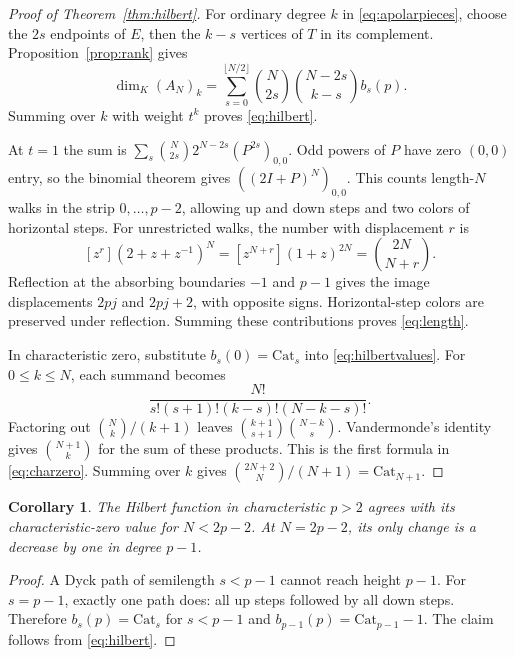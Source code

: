 \documentclass[11pt]{article}
\newtheorem{corollary}[theorem]{Corollary}
\theoremstyle{definition}
\theoremstyle{remark}
\numberwithin{equation}{section}
\newcommand{\kk}{K}
\newcommand{\Cat}{\mathrm{Cat}}
\begin{document}
\begin{proof}[Proof of Theorem~\ref{thm:hilbert}]
For ordinary degree $k$ in \eqref{eq:apolarpieces}, choose the $2s$
endpoints of $E$, then the $k-s$ vertices of $T$ in its complement.
Proposition~\ref{prop:rank} gives
\begin{equation}\label{eq:hilbertvalues}
 \dim_\kk(A_N)_k=
 \sum_{s=0}^{\lfloor N/2\rfloor}
 \binom{N}{2s}\binom{N-2s}{k-s}b_s(p).
\end{equation}
Summing over $k$ with weight $t^k$ proves \eqref{eq:hilbert}.

At $t=1$ the sum is
$\sum_s\binom{N}{2s}2^{N-2s}(P^{2s})_{0,0}$.
Odd powers of $P$ have zero $(0,0)$ entry, so the binomial theorem gives
$((2I+P)^N)_{0,0}$. This counts length-$N$ walks in the strip
$0,\ldots,p-2$, allowing up and down steps and two colors of horizontal
steps. For unrestricted walks, the number with displacement $r$ is
\[
 [z^r](2+z+z^{-1})^N
 =[z^{N+r}](1+z)^{2N}=\binom{2N}{N+r}.
\]
Reflection at the absorbing boundaries $-1$ and $p-1$ gives the image
displacements $2pj$ and $2pj+2$, with opposite signs. Horizontal-step
colors are preserved under reflection. Summing these contributions
proves \eqref{eq:length}.

In characteristic zero, substitute $b_s(0)=\Cat_s$ into
\eqref{eq:hilbertvalues}. For $0\leq k\leq N$, each summand becomes
\[
 \frac{N!}{s!(s+1)!(k-s)!(N-k-s)!}.
\]
Factoring out $\binom{N}{k}/(k+1)$ leaves
$\binom{k+1}{s+1}\binom{N-k}{s}$. Vandermonde's identity gives
$\binom{N+1}{k}$ for the sum of these products. This is the first
formula in \eqref{eq:charzero}. Summing over $k$ gives
$\binom{2N+2}{N}/(N+1)=\Cat_{N+1}$.
\end{proof}

\begin{corollary}\label{cor:first}
The Hilbert function in characteristic $p>2$ agrees with its
characteristic-zero value for $N<2p-2$. At $N=2p-2$, its only change is
a decrease by one in degree $p-1$.
\end{corollary}

\begin{proof}
A Dyck path of semilength $s<p-1$ cannot reach height $p-1$.
For $s=p-1$, exactly one path does: all up steps followed by all down
steps. Therefore $b_s(p)=\Cat_s$ for $s<p-1$ and
$b_{p-1}(p)=\Cat_{p-1}-1$. The claim follows from
\eqref{eq:hilbert}.
\end{proof}
\end{document}
